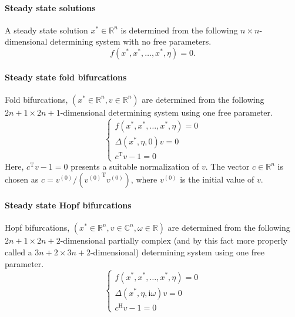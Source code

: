 \documentclass[10pt]{article}
\gdef \i{{\mathrm i}}
\gdef \T{{\mathrm T}}
\gdef \H{{\mathrm H}}
\gdef \RR{{\mathbb R}}
\gdef \CC{{\mathbb C}}
\begin{document}
{\paragraph{Steady state solutions}
A steady state solution $x^*\in\RR^n$ is determined from the following
$n\times n$-dimensional determining system with no free parameters.
\begin{equation}\label{determ_stst}
f(x^*,x^*,\ldots,x^*,\eta)=0.
\end{equation}

\paragraph{Steady state fold bifurcations}
Fold bifurcations, $(x^*\in\RR^n,v\in\RR^n)$ are determined 
from the following
$2n+1\times 2n+1$-dimensional determining system using one free
parameter.
\begin{equation}\label{determ_fold}
\left\{
\begin{array}{l}
f(x^*,x^*,\ldots,x^*,\eta)=0 \\
\Delta(x^*,\eta,0)v=0\\
c^\T v-1=0
\end{array}
\right.
\end{equation}
Here, $c^\T v-1=0$ presents a suitable normalization of $v$.
The vector $c\in\RR^n$ is chosen as $c=v^{(0)}/({v^{(0)}}^\T v^{(0)})$,
where $v^{(0)}$ is the initial value of $v$.

\paragraph{Steady state Hopf bifurcations}
Hopf bifurcations, $(x^*\in\RR^n,v\in\CC^n,\omega\in\RR)$ are determined 
from the following
$2n+1\times 2n+2$-dimensional partially complex 
(and by this fact more properly called a 
$3n+2\times 3n+2$-dimensional)
determining system using one free parameter.
\begin{equation}\label{determ_hopf}
\left\{
\begin{array}{l}
f(x^*,x^*,\ldots,x^*,\eta)=0 \\
\Delta(x^*,\eta,\i\omega)v=0 \\
c^\H v-1=0
\end{array}
\right.
\end{equation}

}
\end{document}
